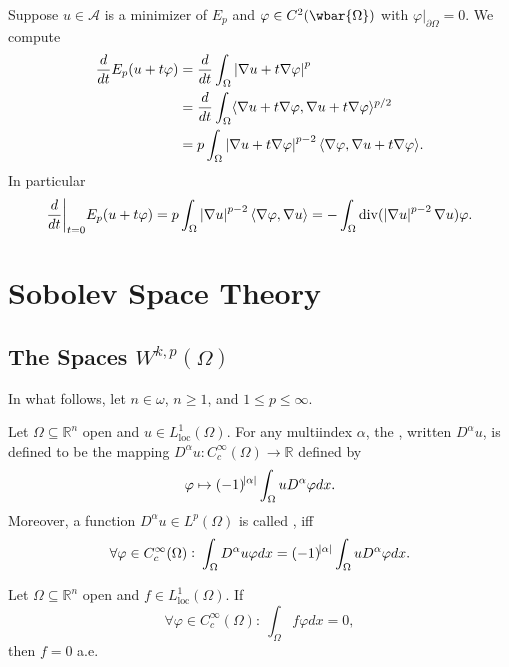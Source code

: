 Suppose $u \in \mathcal{A}$ is a minimizer of $E_p$ and $\varphi \in C^2(\wbar{\Omega})$ with $\varphi\vert_{\partial\Omega} = 0$. We compute
\begin{align*}
	\frac{d}{dt}E_p(u + t\varphi) &= \frac{d}{dt}\int_\Omega \abs[0]{\nabla u + t \nabla \varphi}^p\\
	&= \frac{d}{dt} \int_\Omega \langle \nabla u + t\nabla \varphi,\nabla u + t\nabla \varphi\rangle^{p/2}\\
	&= p\int_\Omega \abs[0]{\nabla u + t \nabla \varphi}^{p - 2}\langle \nabla \varphi,\nabla u + t\nabla \varphi\rangle.
\end{align*}
In particular
\begin{equation*}
	\frac{d}{dt}\bigg\vert_{t = 0} E_p(u + t\varphi) = p\int_\Omega \abs[0]{\nabla u}^{p - 2} \langle \nabla \varphi,\nabla u\rangle = - \int_\Omega \operatorname{div}(\abs[0]{\nabla u}^{p - 2}\nabla u)\varphi.
\end{equation*}

\section*{Sobolev Space Theory}
\subsection*{The Spaces $W^{k,p}(\Omega)$}
In what follows, let $n \in \omega$, $n \geq 1$, and $1 \leq p \leq \infty$.

\begin{definition}
	Let $\Omega \subseteq \mathbb{R}^n$ open and $u \in L^1_{\mathrm{loc}}(\Omega)$. For any multiindex $\alpha$, the , written $D^\alpha u$, is defined to be the mapping $D^\alpha u : C^\infty_c(\Omega) \to \mathbb{R}$ defined by
	\begin{equation*}
		\varphi \mapsto (-1)^{\abs{\alpha}}\int_\Omega u D^\alpha \varphi dx.
	\end{equation*}
	Moreover, a function $D^\alpha u \in L^p(\Omega)$ is called , iff
	\begin{equation*}
		\forall \varphi \in C^\infty_c(\Omega): \> \int_\Omega D^\alpha u \varphi dx =  (-1)^{\abs{\alpha}} \int_\Omega u D^\alpha \varphi dx.
	\end{equation*}
\end{definition}

\begin{theorem}
	\label{thm:flvc}
	Let $\Omega \subseteq \mathbb{R}^n$ open and $f \in L^1_{\mathrm{loc}}(\Omega)$. If
	\begin{equation*}
		\forall \varphi \in C^\infty_c(\Omega) : \> \int_\Omega f \varphi dx = 0,
	\end{equation*}
	\noindent then $f = 0$ a.e.
\end{theorem}

